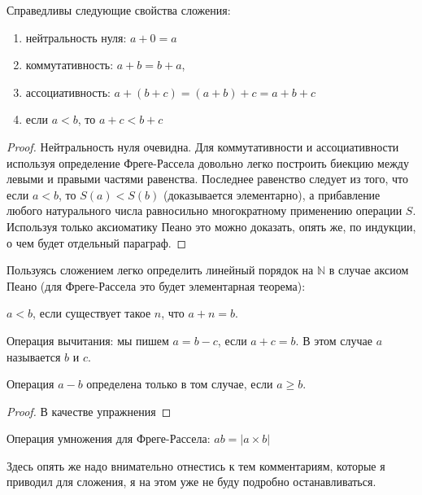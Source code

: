 \begin{thm}
Справедливы следующие свойства сложения:
\begin{enumerate}
\item нейтральность нуля: $a + 0 = a$
\item коммутативность: $a + b = b + a$,
\item ассоциативность: $a + (b + c) = (a + b) + c = a + b + c$
\item если $a < b$, то $a + c < b + c$
\end{enumerate}
\end{thm}
\begin{proof}
Нейтральность нуля очевидна. Для коммутативности и ассоциативности используя определение Фреге-Рассела довольно легко построить биекцию между левыми и правыми частями равенства. Последнее равенство следует из того, что если $a < b$, то $S(a) < S(b)$ (доказывается элементарно), а прибавление любого натурального числа равносильно многократному применению операции $S$. Используя только аксиоматику Пеано это можно доказать, опять же, по индукции, о чем будет отдельный параграф.
\end{proof}

Пользуясь сложением легко определить линейный порядок на $\mathbb{N}$ в случае аксиом Пеано (для Фреге-Рассела это будет элементарная теорема):

\begin{definition}
$a < b$, если существует такое $n$, что $a + n = b$.
\end{definition}

\begin{definition}
Операция вычитания: мы пишем $a = b - c$, если $a + c = b$. В этом случае $a$ называется  $b$ и $c$.
\end{definition}

\begin{thm}
Операция $a - b$ определена только в том случае, если $a \ge b$.
\end{thm}
\begin{proof}В качестве упражнения\end{proof}

\begin{definition}
Операция умножения для Фреге-Рассела: $ab = |a\times b|$
\end{definition}

Здесь опять же надо внимательно отнестись к тем комментариям, которые я приводил для сложения, я на этом уже не буду подробно останавливаться.

